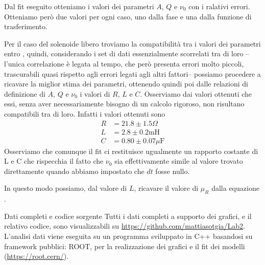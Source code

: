 \documentclass[
    rmp,
    floatfix,
    reprint, 
    superscriptaddress, 
    altaffilletter, 
    amsmath, 
    amssymb, 
    a4paper]{revtex4-2}
\begin{document}
Dal fit eseguito otteniamo i valori dei parametri $A$, $Q$ e $\nu_0$ con i ralativi errori. Otteniamo però due valori per ogni caso, uno dalla fase e una dalla funzione di trasferimento. 

Per il caso del solenoide libero troviamo la compatibilità tra i valori dei parametri entro \treSigma, quindi, considerando i set di dati essenzialmente scorrelati tra di loro --l'unica correlazione è legata al tempo, che però presenta errori molto piccoli, trascurabili quasi rispetto agli errori legati agli altri fattori-- possiamo procedere a ricavare la miglior stima dei parametri, ottenendo quindi poi dalle relazioni di definizione di $A$, $Q$ e $\nu_0$ i valori di $R$, $L$ e $C$. 
Osserviamo dai valori ottenuti che essi, senza aver necessariamente bisogno di un calcolo rigoroso, non risultano compatibili tra di loro. Infatti i valori ottenuti sono \begin{align*}
    R &= 21.8\pm1.5 \Omega\\
    L &= 2.8 \pm 0.2 \text{mH}\\
    C &= 0.80 \pm 0.07 \mu\text{F}
\end{align*}
Osserviamo che comunque il fit ci restituisce ugualmente un rapporto costante di L e C che rispecchia il fatto che $\nu_0$ sia effettivamente simile al valore trovato direttamente quando abbiamo impostato che $dt$ fosse nullo.

In questo modo possiamo, dal valore di $L$, ricavare il valore di $\mu_R$ dalla equazione .





\begin{methods}{D\lowercase{ati completi e codice sorgente}}
    Tutti i dati completi a supporto dei grafici, e il relativo codice, sono visualizzabili su \url{https://github.com/mattiasotgia/Lab2}. L'analisi dati viene eseguita su un programma sviluppato in C++ basandosi su framework pubblici: ROOT, per la realizzazione dei grafici e il fit dei modelli (\url{https://root.cern/}).
\end{methods}


\appendix

\renewcommand{\thetable}{S-\arabic{table}}

\end{document}
